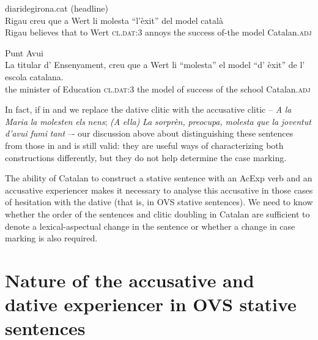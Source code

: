 \documentclass[output=paper,colorlinks,citecolor=brown,nonflat]{./langscibook}
\begin{document}
 \ex diaridegirona.cat (headline)\\
 \gll Rigau creu que a Wert li molesta “l’èxit” del model català\\
 Rigau believes that to Wert \textsc{cl.dat:3} annoys the success of-the model Catalan.\textsc{adj} \\
 \glt
 
  {Punt} {Avui}\\
 \gll La titular d’ Ensenyament, creu que a Wert li “molesta” el model “d’ èxit” de l’ escola catalana.\\
 the minister of Education \textsc{cl.dat:3} the model of success of the school Catalan.\textsc{adj}\\
 \glt
 
 \z
 \z


In fact, if in  and  we replace the dative clitic with the accusative clitic – \textit{A} \textit{la} \textit{Maria} \textit{la} \textit{molesten} \textit{els} \textit{nens}; \textit{(A} \textit{ella)} \textit{La} \textit{sorprèn,} \textit{preocupa,} \textit{molesta} \textit{que} \textit{la} \textit{joventut} \textit{d’avui} \textit{fumi} \textit{tant} –- our discussion above about distinguishing these sentences from those in  and  is still valid: they are useful ways of characterizing both constructions differently, but they do not help determine the case marking.

The ability of Catalan to construct a stative sentence with an AcExp verb and an accusative experiencer makes it necessary to analyse this accusative in those cases of hesitation with the dative (that is, in OVS stative sentences). We need to know whether the order of the sentences and clitic doubling in Catalan are sufficient to denote a lexical-aspectual change in the sentence or whether a change in case marking is also required.


\section{Nature of the accusative and dative experiencer in OVS stative sentences}\label{sec:royo:3}
\end{document}
